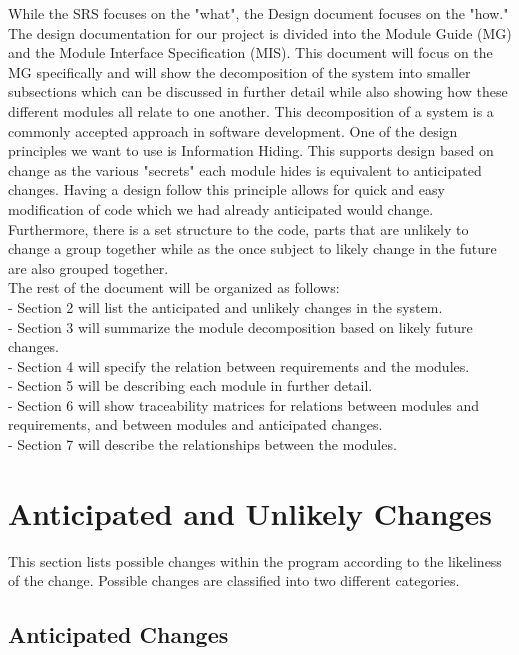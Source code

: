 \documentclass[12pt, letterpaper]{article}
\begin{document}
	While the SRS focuses on the "what", the Design document focuses on the "how." The design documentation for our project is divided into the Module Guide (MG) and the Module Interface Specification (MIS). This document will focus on the MG specifically and will show the decomposition of the system into smaller subsections which can be discussed in further detail while also showing how these different modules all relate to one another. This decomposition of a system is a commonly accepted approach in software development. One of the design principles we want to use is Information Hiding. This supports design based on change as the various "secrets" each module hides is equivalent to anticipated changes. Having a design follow this principle allows for quick and easy modification of code which we had already anticipated would change. Furthermore, there is a set structure to the code, parts that are unlikely to change a group together while as the once subject to likely change in the future are also grouped together. \\
	
	\noindent The rest of the document will be organized as follows: \\
	- Section 2 will list the anticipated and unlikely changes in the system. \\
	- Section 3 will summarize the module decomposition based on likely future changes. \\
	- Section 4 will specify the relation between requirements and the modules. \\
	- Section 5 will be describing each module in further detail. \\
	- Section 6 will show traceability matrices for relations between modules and requirements, and between modules and anticipated changes. \\
	- Section 7 will describe the relationships between the modules. \\
	
	\section{Anticipated and Unlikely Changes}
	
	This section lists possible changes within the program according to the likeliness of the change. Possible changes are classified into two different categories.
	
	\subsection{Anticipated Changes}
	
\end{document}
